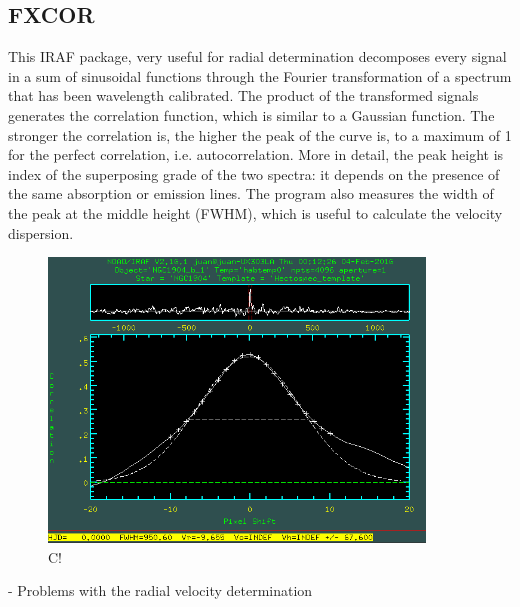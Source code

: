 \subsection{FXCOR}

This IRAF package, very useful for radial determination decomposes every signal in a sum of sinusoidal functions through the Fourier transformation of a spectrum that has been wavelength calibrated. The product of the transformed signals generates the correlation function, which is similar to a Gaussian function. The stronger the correlation is, the higher the peak of the curve is, to a maximum of 1 for the perfect correlation, i.e. autocorrelation. More in detail, the peak height is index of the superposing grade of the two spectra: it depends on the presence of the same absorption or emission lines. The program also measures the width of the peak at the middle height (FWHM), which is useful to calculate the velocity dispersion.

\begin{figure}[H]
\centering
\includegraphics[width=10cm]{images/fxcor.png}
\caption[Ts]{C!}
\end{figure}

- Problems with the radial velocity determination



